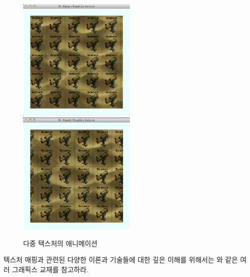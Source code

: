 \begin{figure}[h!]
    \centering
	\includegraphics[height=6cm]{OGL_texture/multiTexAni_A.png} 
	\includegraphics[height=6cm]{OGL_texture/multiTexAni_B.png} 
    \caption{다중 텍스처의 애니메이션}
    \label{fig:OGL_texture:multiTexAnimation}
\end{figure}

텍스처 매핑과 관련된 다양한 이론과 기술들에 대한 깊은 이해를 위해서는 \cite{hearn1997computer,akenine2011real,foley1994introduction}와 같은 여러 그래픽스 교재를 참고하라.
